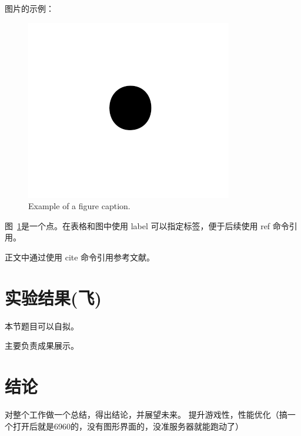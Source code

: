 \documentclass[conference]{IEEEtran}
\begin{document}
图片的示例：
\begin{figure}[htbp]
\centerline{\includegraphics{images/fig1.png}}
\caption{Example of a figure caption.}
\label{fig:figure1}
\end{figure}
图~\ref{fig:figure1}是一个点。在表格和图中使用 label 可以指定标签，便于后续使用 ref 命令引用。


正文中通过使用 cite 命令引用参考文献。


\section{实验结果(飞)}
本节题目可以自拟。

主要负责成果展示。


\section{结论}
对整个工作做一个总结，得出结论，并展望未来。
提升游戏性，性能优化（搞一个打开后就是6960的，没有图形界面的，没准服务器就能跑动了）





\end{document}
